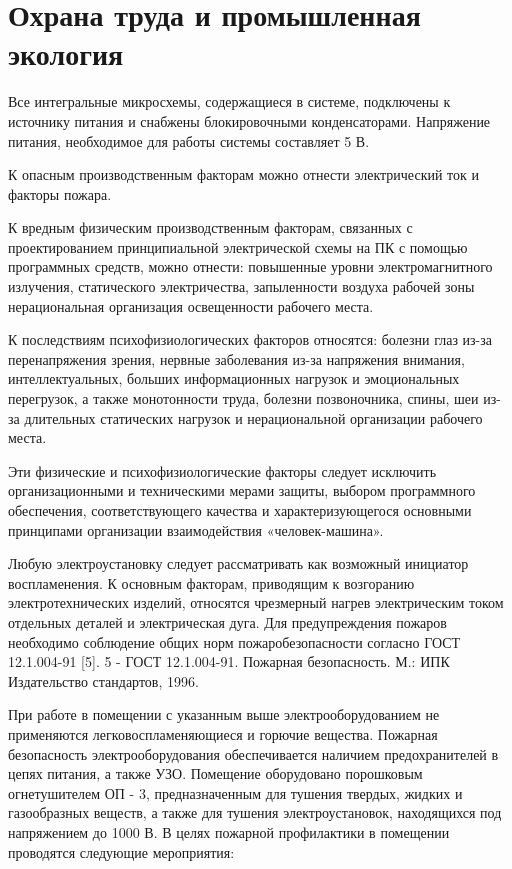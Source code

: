\section{Охрана труда и промышленная экология}

Все интегральные микросхемы, содержащиеся в системе, подключены к источнику
питания и снабжены блокировочными конденсаторами. Напряжение питания,
необходимое для работы системы составляет 5 В.

К опасным производственным факторам можно отнести электрический ток и факторы пожара.

К вредным физическим производственным факторам, связанных с проектированием принципиальной электрической схемы на ПК с помощью программных средств, можно отнести: повышенные уровни электромагнитного излучения, статического электричества, запыленности воздуха рабочей зоны нерациональная организация освещенности рабочего места. 

К последствиям психофизиологических факторов относятся: болезни глаз из-за перенапряжения зрения, нервные заболевания из-за напряжения внимания, интеллектуальных, больших информационных нагрузок и эмоциональных перегрузок, а также монотонности труда, болезни позвоночника, спины, шеи из-за длительных статических нагрузок и нерациональной организации рабочего места. 

Эти физические и психофизиологические факторы следует исключить организационными и техническими мерами защиты, выбором программного обеспечения, соответствующего качества и характеризующегося основными принципами организации взаимодействия «человек-машина». 

Любую электроустановку следует рассматривать как возможный инициатор воспламенения. К основным факторам, приводящим к возгоранию электротехнических изделий, относятся чрезмерный нагрев электрическим током отдельных деталей и электрическая дуга. Для предупреждения пожаров необходимо соблюдение общих норм пожаробезопасности согласно ГОСТ 12.1.004-91 [5]. 5 - ГОСТ 12.1.004-91. Пожарная безопасность. М.: ИПК Издательство стандартов, 1996. 

При работе в помещении с указанным выше электрооборудованием не применяются легковоспламеняющиеся и горючие вещества. Пожарная безопасность электрооборудования обеспечивается наличием предохранителей в цепях питания, а также УЗО. Помещение оборудовано порошковым огнетушителем ОП - 3, предназначенным для тушения твердых, жидких и газообразных веществ, а также для тушения электроустановок, находящихся под напряжением до 1000 В. В целях пожарной профилактики в помещении проводятся следующие мероприятия:

